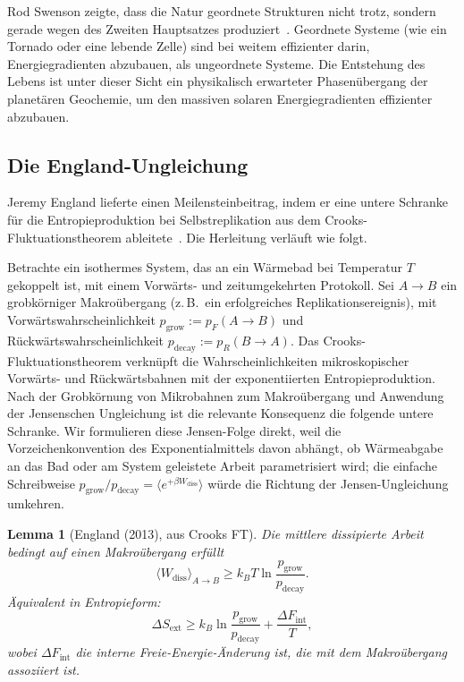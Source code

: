 \documentclass[12pt,a4paper]{article}
\newtheorem{lemma}{Lemma}
\theoremstyle{remark}
\begin{document}
Rod Swenson zeigte, dass die Natur geordnete Strukturen nicht trotz, sondern gerade wegen des Zweiten Hauptsatzes produziert~\citep{ThermodynamicsLife}. Geordnete Systeme (wie ein Tornado oder eine lebende Zelle) sind bei weitem effizienter darin, Energiegradienten abzubauen, als ungeordnete Systeme. Die Entstehung des Lebens ist unter dieser Sicht ein physikalisch erwarteter Phasenübergang der planetären Geochemie, um den massiven solaren Energiegradienten effizienter abzubauen.

\subsection{Die England-Ungleichung}

Jeremy England lieferte einen Meilensteinbeitrag, indem er eine untere Schranke für die Entropieproduktion bei Selbstreplikation aus dem Crooks-Fluktuationstheorem ableitete~\citep{Crooks1999,England2013}. Die Herleitung verläuft wie folgt.

Betrachte ein isothermes System, das an ein Wärmebad bei Temperatur $T$ gekoppelt ist, mit einem Vorwärts- und zeitumgekehrten Protokoll. Sei $A \to B$ ein grobkörniger Makroübergang (z.\,B.\ ein erfolgreiches Replikationsereignis), mit Vorwärtswahrscheinlichkeit $p_{\mathrm{grow}} := p_F(A \to B)$ und Rückwärtswahrscheinlichkeit $p_{\mathrm{decay}} := p_R(B \to A)$. Das Crooks-Fluktuationstheorem verknüpft die Wahrscheinlichkeiten mikroskopischer Vorwärts- und Rückwärtsbahnen mit der exponentiierten Entropieproduktion. Nach der Grobkörnung von Mikrobahnen zum Makroübergang und Anwendung der Jensenschen Ungleichung ist die relevante Konsequenz die folgende untere Schranke. Wir formulieren diese Jensen-Folge direkt, weil die Vorzeichenkonvention des Exponentialmittels davon abhängt, ob Wärmeabgabe an das Bad oder am System geleistete Arbeit parametrisiert wird; die einfache Schreibweise $p_{\mathrm{grow}}/p_{\mathrm{decay}}=\langle e^{+\beta W_{\mathrm{diss}}}\rangle$ würde die Richtung der Jensen-Ungleichung umkehren.

\begin{lemma}[England (2013), aus Crooks FT]
\label{lem:england}
Die mittlere dissipierte Arbeit bedingt auf einen Makroübergang erfüllt
\begin{equation}
\langle W_{\mathrm{diss}} \rangle_{A \to B} \geq k_B T \ln \frac{p_{\mathrm{grow}}}{p_{\mathrm{decay}}}.
\end{equation}
Äquivalent in Entropieform:
\begin{equation}
\Delta S_{\mathrm{ext}} \geq k_B \ln \frac{p_{\mathrm{grow}}}{p_{\mathrm{decay}}} + \frac{\Delta F_{\mathrm{int}}}{T},
\end{equation}
wobei $\Delta F_{\mathrm{int}}$ die interne Freie-Energie-Änderung ist, die mit dem Makroübergang assoziiert ist.
\end{lemma}
\end{document}
